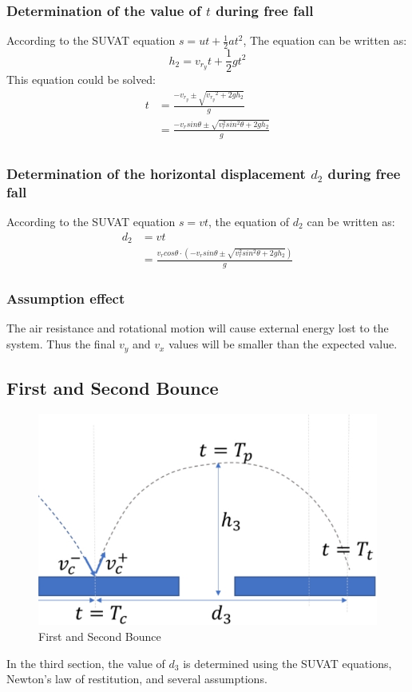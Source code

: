 \documentclass{article}
\begin{document}
        \subsubsection{Determination of the value of $t$ during free fall}
            According to the SUVAT equation $s = ut +\frac{1}{2}at^2$, The equation can be written as:
            \begin{equation}
                h_2 = v_{r_y}t + \frac{1}{2}gt^2 \nonumber
            \end{equation}
            This equation could be solved:
            \begin{equation}
                \begin{aligned}
                    t &= \frac{-v_{r_y}\pm\sqrt{{v_{r_y}}^2+2gh_2}}{g}\\
                      &= \frac{-v_{r}sin\theta\pm\sqrt{{v^2_{r}sin^2\theta}+2gh_2}}{g}\\
                \end{aligned}
            \end{equation}
        \subsubsection{Determination of the horizontal displacement $d_2$ during free fall }
            According to the SUVAT equation $s = vt$, the equation of $d_2$ can be written as:
                \begin{equation}
                    \begin{aligned}
                        d_2 &= vt
                        \\ &= \frac{v_rcos\theta \cdot (-v_{r}sin\theta\pm\sqrt{{v^2_{r}sin^2\theta}+2gh_2})}{g}
                    \end{aligned}
                \end{equation}
        \subsubsection{Assumption effect}
        The air resistance and rotational motion will cause external energy lost to the system. Thus the final $v_y$ and $v_x$ values will be smaller than the expected value.
    \subsection{First and Second Bounce}
    \begin{figure}[H]
        \centering
        \includegraphics[width=0.5\linewidth]{bounce.png}
        \caption{First and Second Bounce}
        \label{fig:first_second_bounce}
    \end{figure}
        In the third section, the value of $d_3$ is determined using the SUVAT equations, Newton's law of restitution, and several assumptions.
\end{document}
